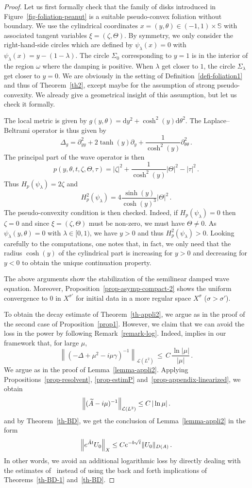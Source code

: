\documentclass[AHL,Unicode,longabstracts]{cedram}
\renewcommand{\SS}{\mathbb{S}}
\newcommand{\Lc}{\mathcal{L}}
\newcommand{\drm}{\mathrm{d}}
\let\oldtilde\tilde
\renewcommand*{\tilde}[1]{\mathchoice{\widetilde{#1}}{\widetilde{#1}}{\oldtilde{#1}}{\oldtilde{#1}}}\let\oldexists\exists
\renewcommand*{\exists}{\mathrel{\oldexists}}
\begin{document}
\begin{proof}
Let us first formally check that the family of disks introduced in Figure~\ref{fig-foliation-peanut} is a suitable pseudo-convex foliation without boundary. We use the cylindrical coordinates $x=(y,\theta)\in (-1,1)\times\SS$ with associated tangent variables $\xi=(\zeta,\Theta)$. By symmetry, we only consider the right-hand-side circles which are defined by $\psi_\lambda(x)=0$ with $\psi_\lambda(x)=y-(1-\lambda)$. The circle $\Sigma_0$ corresponding to $y=1$ is in the interior of the region $\omega$ where the damping is positive. When $\lambda$ get closer to $1$, the circle $\Sigma_\lambda$ get closer to $y=0$. We are obviously in the setting of Definition~\ref{defi-foliation1} and thus of Theorem~\ref{th2}, except maybe for the assumption of strong pseudo-convexity. We already give a geometrical insight of this assumption, but let us check it formally.

The local metric is given by $g(y,\theta)=\drm y^2+\cosh^2(y)\drm\theta^2$. The Laplace--Beltrami operator is thus given by
\[
\Delta_g = \partial_{yy}^2 + 2\tanh(y)\partial_y + \frac 1
{\cosh^2(y)}\partial^2_{\theta\theta}\,.
\]
The principal part of the wave operator is then
\[
p(y,\theta,t,\zeta,\Theta,
\tau)=|\zeta|^2+\frac 1{\cosh^2(y)}|\Theta|^2-|\tau|^2\,.
\]
Thus $H_p(\psi_\lambda)=2\zeta$ and
\[
H_p^2(\psi_\lambda)=4 \frac{\sinh(y)}{\cosh(y)^3} |\Theta|^2\,.
\]
The pseudo-convexity condition is then checked. Indeed, if $H_p(\psi_\lambda)=0$ then $\zeta=0$ and since $\xi=(\zeta,\Theta)$ must be non-zero, we must have $\Theta\neq 0$. As $\psi_\lambda(y,\theta)=0$ with $\lambda\in[0,1)$, we have $y>0$ and thus $H_p^2(\psi_\lambda)>0$. Looking carefully to the computations, one notes that, in fact, we only need that the radius $\cosh(y)$ of the cylindrical part is increasing for $y>0$ and decreasing for $y<0$ to obtain the unique continuation property.

The above arguments show the stabilization of the semilinear damped wave equation. Moreover, Proposition~\ref{prop-asymp-compact-2} shows the uniform convergence to $0$ in $X^{\sigma'}$ for initial data in a more regular space $X^\sigma$ ($\sigma>\sigma'$).

To obtain the decay estimate of Theorem~\ref{th-appli2}, we argue as in the proof of the second case of Proposition~\ref{prop1}. However, we claim that we can avoid the loss in the power by following Remark~\ref{remark-log}. Indeed, \cite[Theorem~5.1]{CSVW} implies in our framework that, for large $\mu$,
\[
\left\|(-\Delta+\mu^2-i\mu\gamma)^{-1}\right\|_{\Lc(L^2)}\,\leq\,
C\,\frac{\ln|\mu|}{|\mu|}\,.
\]
We argue as in the proof of Lemma~\ref{lemma-appli2}. Applying Propositions~\ref{prop-resolvent}, \ref{prop-estimP} and~\ref{prop-appendix-linearized}, we obtain
\[
\left\|(\tilde A-i\mu)^{-1}\right\|_{\Lc(L^2)} \leq C \, {|\ln \mu|}\,.
\]
and by Theorem~\ref{th-BD}, we get the conclusion of Lemma~\ref{lemma-appli2} in the form
\[
\left\|e^{\tilde A t}U_0\right\|_X \leq Ce^{-b\sqrt{t}} \|U_0\|_{D(A)}\,.
\]
In other words, we avoid an additional logarithmic loss by directly dealing with the estimates of~\cite{CSVW} instead of using the back and forth implications of Theorems~\ref{th-BD-1} and~\ref{th-BD}.


\end{proof}
\end{document}
